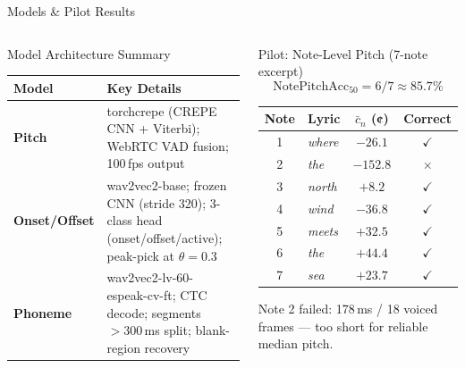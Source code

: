\documentclass[aspectratio=169,9pt]{beamer}
\begin{document}
\begin{frame}{Models \& Pilot Results}
  \begin{columns}[T]
      \begin{block}{Model Architecture Summary}
        \small
        \renewcommand{\arraystretch}{1.15}
        \begin{tabular}{@{}lp{5.2cm}@{}}
          \toprule
          Model & Key Details \\
          \midrule
          \textbf{Pitch} & torchcrepe (CREPE CNN + Viterbi);
                           WebRTC VAD fusion; 100\,fps output \\
          \textbf{Onset/Offset} & wav2vec2-base; frozen CNN (stride 320);
                                  3-class head (onset/offset/active);
                                  peak-pick at $\theta=0.3$ \\
          \textbf{Phoneme} & wav2vec2-lv-60-espeak-cv-ft;
                             CTC decode; segments $>300$\,ms split;
                             blank-region recovery \\
          \bottomrule
        \end{tabular}
      \end{block}

      \begin{block}{Pilot: Note-Level Pitch (7-note excerpt)}
        \[
          \mathrm{NotePitchAcc}_{50} = 6/7 \approx 85.7\%
        \]
        \footnotesize
        \renewcommand{\arraystretch}{1.1}
        \begin{tabular}{@{}clcc@{}}
          \toprule
          Note & Lyric & $\bar{c}_n$ (¢) & Correct \\
          \midrule
          1 & \textit{where} & $-26.1$ & $\checkmark$ \\
          2 & \textit{the}   & $-152.8$ & $\times$ \\
          3 & \textit{north} & $+8.2$  & $\checkmark$ \\
          4 & \textit{wind}  & $-36.8$ & $\checkmark$ \\
          5 & \textit{meets} & $+32.5$ & $\checkmark$ \\
          6 & \textit{the}   & $+44.4$ & $\checkmark$ \\
          7 & \textit{sea}   & $+23.7$ & $\checkmark$ \\
          \bottomrule
        \end{tabular}
        \medskip\par
        Note 2 failed: 178\,ms / 18 voiced frames — too short for reliable median pitch.
      \end{block}
  \end{columns}
\end{frame}
\end{document}
